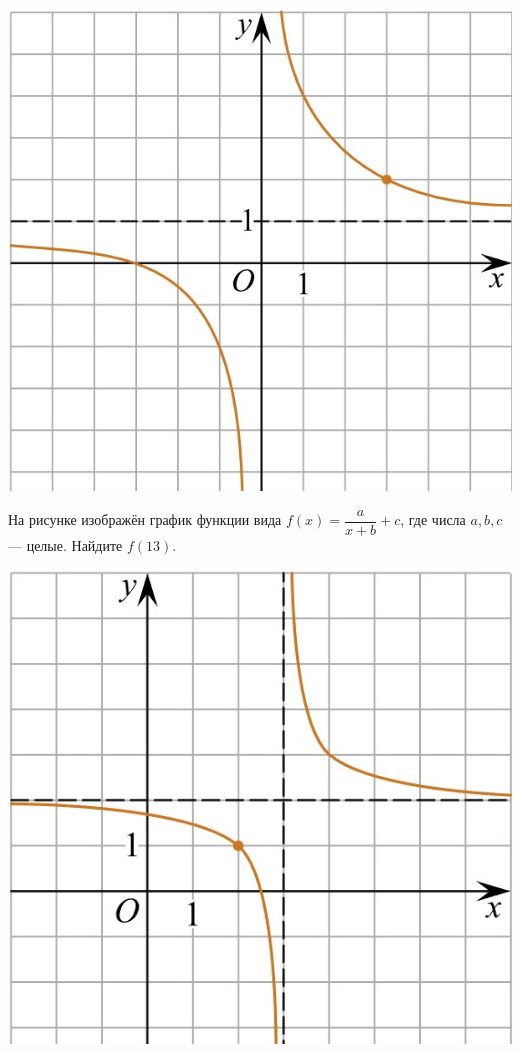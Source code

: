 \begin{class}[number=4]
\begin{listofex}
\begin{minipage}[c]{0.25\textwidth}
			\includegraphics[align=t, width=\textwidth]{pics/G101M4C4-7.jpg}
		\end{minipage}
		\item
		\begin{minipage}[t]{0.67\textwidth}
			На рисунке изображён график функции вида \(f(x)=\dfrac{a}{x+b}+c\), где числа \(a, b, c\) --- целые. Найдите \(f(13)\).
		\end{minipage}
		\begin{minipage}[c]{0.25\textwidth}
			\includegraphics[align=t, width=\textwidth]{pics/G101M4C4-8.jpg}

\end{minipage}
\end{listofex}
\end{class}
